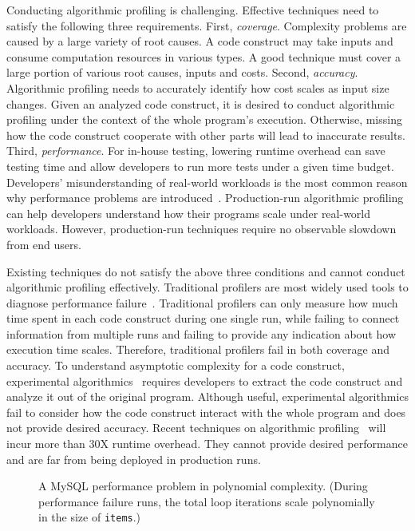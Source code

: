 Conducting algorithmic profiling is challenging. 
Effective techniques need to satisfy the following three requirements.
First, \textit{coverage}. Complexity problems are caused by a large variety of root causes. 
A code construct may take inputs and consume computation resources in various types.
A good technique must cover a large portion of various root causes, inputs and costs.
Second, \textit{accuracy}. Algorithmic profiling needs to accurately identify 
how cost scales as input size changes.
Given an analyzed code construct,
it is desired to conduct algorithmic profiling under the context of the whole program's execution. 
Otherwise, missing how the code construct cooperate with other parts will lead to inaccurate results. 
Third, \textit{performance}. 
For in-house testing, lowering runtime overhead can save testing time 
and allow developers to run more tests under a given time budget. 
Developers' misunderstanding of real-world workloads 
is the most common reason why performance problems are introduced~\cite{PerfBug}. 
Production-run algorithmic profiling can help developers 
understand how their programs scale under real-world workloads.
However, production-run techniques require no observable slowdown from end users. 

Existing techniques do not satisfy the above three conditions and 
cannot conduct algorithmic profiling effectively. 
Traditional profilers are most widely used tools to 
diagnose performance failure~\cite{gprof,oprofile}. 
Traditional profilers can only measure how much time spent in each code construct during one single run, 
while failing to connect information from multiple runs 
and failing to provide any indication about how execution time scales.
Therefore, traditional profilers fail in both coverage and accuracy.  
To understand asymptotic complexity for a code construct,
experimental algorithmics~\cite{expalg1,expalg2,expalg3} requires developers to 
extract the code construct and analyze it out of the original program. 
Although useful,
experimental algorithmics fail to consider how the code 
construct interact with the whole program and does not provide desired accuracy. 
Recent techniques on algorithmic profiling~\cite{Aprof1,Aprof2,AlgoProf} will incur more than 30X runtime overhead.
They cannot provide desired performance and are far from being deployed in production runs. 


\begin{figure}
\centering
{}
  \mbox{}
\caption{A MySQL performance problem in polynomial complexity. 
\footnotesize{(During performance failure runs, 
   the total loop iterations scale polynomially in the size of \texttt{items}.)}}
\vspace{-0.05in}
\label{fig:mysql27287}
\vspace{-0.05in}
\end{figure}

